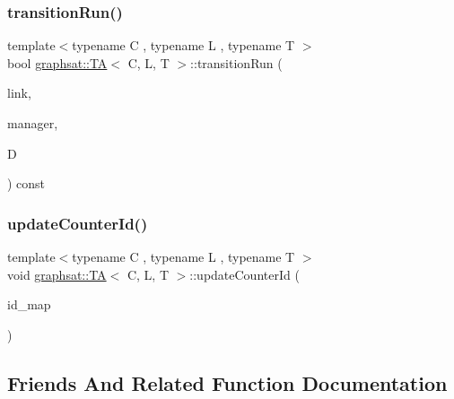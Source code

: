 \mbox{\label{classgraphsat_1_1_t_a_a6c73bfefdea0464e1948377f21905499}} 
\subsubsection{\texorpdfstring{transitionRun()}{transitionRun()}}
{\footnotesize\ttfamily template$<$typename C , typename L , typename T $>$ \\
bool \mbox{\hyperlink{classgraphsat_1_1_t_a}{graphsat\+::\+TA}}$<$ C, L, T $>$\+::transition\+Run (\begin{DoxyParamCaption}\item[{int}]{link,  }\item[{const \mbox{\hyperlink{classgraphsat_1_1_d_b_m_factory}{D\+B\+M\+Factory}}$<$ C $>$ \&}]{manager,  }\item[{C $\ast$}]{D }\end{DoxyParamCaption}) const\hspace{0.3cm}{\ttfamily [inline]}}

\mbox{\label{classgraphsat_1_1_t_a_ac3eb735aa539ad827c65930526effa07}} 
\subsubsection{\texorpdfstring{updateCounterId()}{updateCounterId()}}
{\footnotesize\ttfamily template$<$typename C , typename L , typename T $>$ \\
void \mbox{\hyperlink{classgraphsat_1_1_t_a}{graphsat\+::\+TA}}$<$ C, L, T $>$\+::update\+Counter\+Id (\begin{DoxyParamCaption}\item[{const map$<$ int, int $>$ \&}]{id\+\_\+map }\end{DoxyParamCaption})\hspace{0.3cm}{\ttfamily [inline]}}



\subsection{Friends And Related Function Documentation}
\mbox{\label{classgraphsat_1_1_t_a_ac274586d6140dff44fa1029371c2cf48}} 
